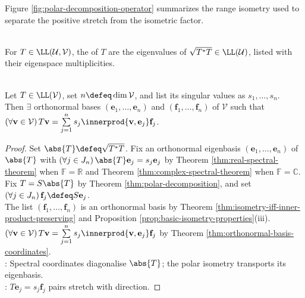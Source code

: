 Figure \ref{fig:polar-decomposition-operator} summarizes the range isometry used to separate the positive stretch from the isometric factor.

\begin{illustrationfigure}[H]
  \centering
  
  \caption{Polar decomposition builds $S_1$ using $\norm{T\mathbf{v}}=\norm{\sqrt{T^*T}\mathbf{v}}$.}
  \label{fig:polar-decomposition-operator}
\end{illustrationfigure}

\begin{definition} \label{def:singular-values} \\
For $T\in\LL(\mathcal{U},\mathcal{V})$, the  of $T$ are the eigenvalues of $\sqrt{T^*T}\in\LL(\mathcal{U})$, listed with their eigenspace multiplicities.
\end{definition}

\begin{theorem} \label{thm:singular-value-decomposition} \\
Let $T\in\LL(\mathcal{V})$, set $n\defeq\dim\mathcal{V}$, and list its singular values as $s_1,\ldots,s_n$.\\
Then $\exists$ orthonormal bases $(\mathbf{e}_1,\ldots,\mathbf{e}_n)$ and $(\mathbf{f}_1,\ldots,\mathbf{f}_n)$ of $\mathcal{V}$ such that $(\forall\mathbf{v}\in\mathcal{V})\,T\mathbf{v}=\sum\limits_{j=1}^{n}s_j\innerprod{\mathbf{v},\mathbf{e}_j}\mathbf{f}_j$.
\begin{proof}
Set $\abs{T}\defeq\sqrt{T^*T}$. Fix an orthonormal eigenbasis $(\mathbf{e}_1,\ldots,\mathbf{e}_n)$ of $\abs{T}$ with $(\forall j\in J_n)\,\abs{T}\mathbf{e}_j=s_j\mathbf{e}_j$ by Theorem \ref{thm:real-spectral-theorem} when $\mathbb{F}=\mathbb{R}$ and Theorem \ref{thm:complex-spectral-theorem} when $\mathbb{F}=\mathbb{C}$. Fix $T=S\abs{T}$ by Theorem \ref{thm:polar-decomposition}, and set $(\forall j\in J_n)\,\mathbf{f}_j\defeq S\mathbf{e}_j$.\\
The list $(\mathbf{f}_1,\ldots,\mathbf{f}_n)$ is an orthonormal basis by Theorem \ref{thm:isometry-iff-inner-product-preserving} and Proposition \ref{prop:basic-isometry-properties}(iii). $(\forall\mathbf{v}\in\mathcal{V})\,T\mathbf{v}=\sum\limits_{j=1}^{n}s_j\innerprod{\mathbf{v},\mathbf{e}_j}\mathbf{f}_j$ by Theorem \ref{thm:orthonormal-basis-coordinates}.\\
: Spectral coordinates diagonalise $\abs{T}$; the polar isometry transports its eigenbasis.\\
: $T\mathbf{e}_j=s_j\mathbf{f}_j$ pairs stretch with direction.
\end{proof}
\end{theorem}

